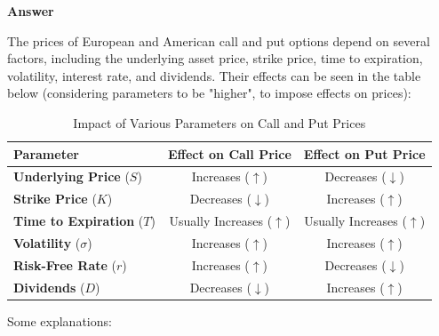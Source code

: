 \documentclass[letterpaper]{article}
\begin{document}
		\textbf{Answer}
		
		
		The prices of {European and American} call and put options depend on several factors, including the {underlying asset price}, {strike price}, {time to expiration}, {volatility}, {interest rate}, and {dividends}. Their effects can be seen in the table below (considering parameters to be "higher", to impose effects on prices):
		
	\begin{table}[h]
		\centering
		\begin{tabular}{|l|c|c|}
			\hline
			\textbf{Parameter} & \textbf{Effect on Call Price} & \textbf{Effect on Put Price} \\
			\hline
			\textbf{Underlying Price} ($S$) & Increases ($\uparrow$) & Decreases ($\downarrow$) \\
			\hline
			\textbf{Strike Price} ($K$) & Decreases ($\downarrow$) & Increases ($\uparrow$) \\
			\hline
			\textbf{Time to Expiration} ($T$) & Usually Increases ($\uparrow$) & Usually Increases ($\uparrow$) \\
			\hline
			\textbf{Volatility} ($\sigma$) & Increases ($\uparrow$) & Increases ($\uparrow$) \\
			\hline
			\textbf{Risk-Free Rate} ($r$) & Increases ($\uparrow$) & Decreases ($\downarrow$) \\
			\hline
			\textbf{Dividends} ($D$) & Decreases ($\downarrow$) & Increases ($\uparrow$) \\
			\hline
		\end{tabular}
		\caption{Impact of Various Parameters on Call and Put Prices}
		\label{tab:effects}
	\end{table}
		
		Some explanations:
		
\end{document}
